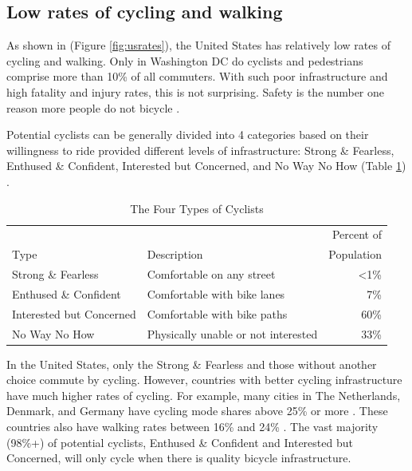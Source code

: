 \documentclass{article}
\begin{document}
\subsection*{Low rates of cycling and walking}
As shown in (Figure \ref{fig:usrates}), the United States has relatively low rates of cycling and walking. Only in Washington DC do cyclists and pedestrians comprise more than 10\% of all commuters. With such poor infrastructure and high fatality and injury rates, this is not surprising. Safety is the number one reason more people do not bicycle \citep[Page 1]{geller2006}. 

Potential cyclists can be generally divided into 4 categories based on their willingness to ride provided different levels of infrastructure: Strong \& Fearless, Enthused \& Confident, Interested but Concerned, and No Way No How (Table \ref{table:fourtypes}) \citep[Page 3]{geller2006} \citep[Page 6-7]{dill2012}.

\begin{table}[h]
  \centering
\begin{tabular}{ l l r }
    & & Percent of \\
    Type & Description & Population \\
  \hline
    Strong \& Fearless & Comfortable on any street & \textless1\% \\
    Enthused \& Confident & Comfortable with bike lanes & 7\% \\
    Interested but Concerned & Comfortable with bike paths & 60\% \\
    No Way No How & Physically unable or not interested & 33\% \\
\end{tabular}
    \caption{The Four Types of Cyclists \citep{geller2006}}
    \label{table:fourtypes}
\end{table}

In the United States, only the Strong \& Fearless and those without another choice commute by cycling. However, countries with better cycling infrastructure have much higher rates of cycling. For example, many cities in The Netherlands, Denmark, and Germany have cycling mode shares above 25\% or more \citep[Page 45]{pucher2008}. These countries also have walking rates between 16\% and 24\% \citep[Page 35]{buehler2012}. The vast majority (98\%+) of potential cyclists, Enthused \& Confident and Interested but Concerned, will only cycle when there is quality bicycle infrastructure. 
\end{document}
